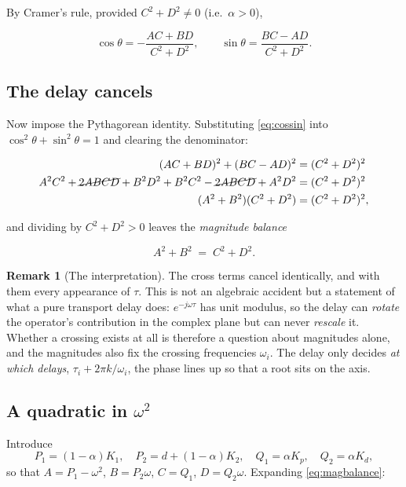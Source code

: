 \documentclass[11pt,a4paper]{article}
\theoremstyle{plain}
\theoremstyle{definition}
\newtheorem{remark}{Remark}
\begin{document}
By Cramer's rule, provided $C^2 + D^2 \neq 0$ (i.e.\ $\alpha > 0$),

\begin{equation}
\cos\theta = -\frac{AC + BD}{C^{2}+D^{2}},
\qquad
\sin\theta = \frac{BC - AD}{C^{2}+D^{2}}.
\label{eq:cossin}
\end{equation}

\subsection{The delay cancels}

Now impose the Pythagorean identity. Substituting \eqref{eq:cossin} into
$\cos^2\theta + \sin^2\theta = 1$ and clearing the denominator:

\begin{align}
(AC + BD)^2 + (BC - AD)^2 &= (C^2 + D^2)^2 \nonumber\\
A^2C^2 + \cancel{2ABCD} + B^2D^2 + B^2C^2 - \cancel{2ABCD} + A^2D^2
&= (C^2+D^2)^2 \nonumber\\
(A^2 + B^2)(C^2 + D^2) &= (C^2+D^2)^2,
\end{align}

and dividing by $C^2 + D^2 > 0$ leaves the \emph{magnitude balance}

\begin{equation}
\boxed{\;A^{2} + B^{2} \;=\; C^{2} + D^{2}.\;}
\label{eq:magbalance}
\end{equation}

\begin{remark}[The interpretation]
The cross terms cancel identically, and with them every appearance of
$\tau$. This is not an algebraic accident but a statement of what a pure
transport delay does: $e^{-j\omega\tau}$ has unit modulus, so the delay
can \emph{rotate} the operator's contribution in the complex plane but
can never \emph{rescale} it. Whether a crossing exists at all is
therefore a question about magnitudes alone, and the magnitudes also fix
the crossing frequencies $\omega_i$. The delay only decides \emph{at
which delays}, $\tau_i + 2\pi k/\omega_i$, the phase lines up so that a
root sits on the axis.
\end{remark}

\subsection{A quadratic in \texorpdfstring{$\omega^2$}{omega squared}}

Introduce
\begin{equation}
P_1 = (1-\alpha)K_1, \quad
P_2 = d + (1-\alpha)K_2, \quad
Q_1 = \alpha K_p, \quad
Q_2 = \alpha K_d ,
\end{equation}
so that $A = P_1 - \omega^2$, $B = P_2\omega$, $C = Q_1$,
$D = Q_2\omega$. Expanding \eqref{eq:magbalance}:
\end{document}
